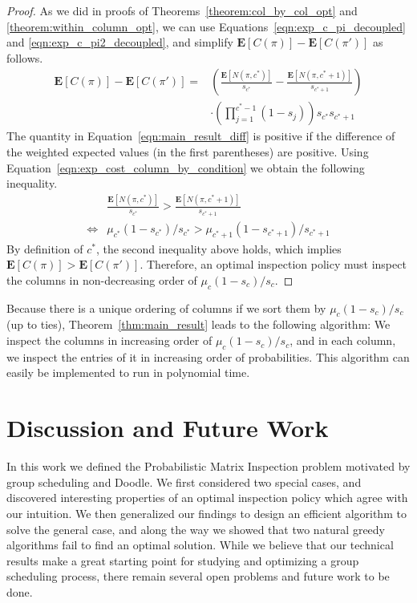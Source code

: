 \begin{proof}
 	As we did in proofs of Theorems~\ref{theorem:col_by_col_opt} and \ref{theorem:within_column_opt}, we can use Equations~\ref{eqn:exp_c_pi_decoupled} and \ref{eqn:exp_c_pi2_decoupled}, and simplify $\mathbf{E}[C(\pi)] - \mathbf{E}[C(\pi')]$ as follows.
	\small
 	\begin{equation} \label{eqn:main_result_diff}
 		\begin{aligned}
 		\mathbf{E}[C(\pi)] - \mathbf{E}[C(\pi')] ={} & \left(\frac{\mathbf{E}[N(\pi, c^*)]}{s_{c^*}}  - \frac{\mathbf{E}[N(\pi, c^*+1)]}{s_{c^*+1}} \right) \\
 		& \cdot \left( \prod_{j=1}^{c^*-1} (1 - s_j)\right) s_{c^*} s_{c^*+1}
 		 \end{aligned}
 	\end{equation}	
	\normalsize
 	The quantity in Equation~\ref{eqn:main_result_diff} is positive if the difference of the weighted expected values (in the first parentheses) are positive. Using Equation~\ref{eqn:exp_cost_column_by_condition} we obtain the following inequality.
 	\begin{equation*}
 		\begin{aligned}
 			{} &
 		\frac{\mathbf{E}[N(\pi, c^*)]}{s_{c^*}}  > \frac{\mathbf{E}[N(\pi, c^*+1)]}{s_{c^*+1}} \\
 		\Leftrightarrow &
 		\mu_{c^*} (1 - s_{c^*}) / s_{c^*} > \mu_{c^*+1}(1 - s_{c^*+1}) / s_{c^*+1} 
 		\end{aligned}
 	\end{equation*}
 	By definition of $c^*$, the second inequality above holds, which implies $\mathbf{E}[C(\pi)] > \mathbf{E}[C(\pi')]$.
 	Therefore, an optimal inspection policy must inspect the columns in non-decreasing order of $\mu_c(1 - s_c)/s_c$. 
 \end{proof}
 Because there is a unique ordering of columns if we sort them by $\mu_c(1-s_c)/s_c$ (up to ties), Theorem~\ref{thm:main_result} leads to the following algorithm: We inspect the columns in increasing order of $\mu_c(1-s_c)/s_c$, and in each column, we inspect the entries of it in increasing order of probabilities. 
 This algorithm can easily be implemented to run in polynomial time. 


\section{Discussion and Future Work} \label{matrix:sec:discussion}
In this work we defined the Probabilistic Matrix Inspection problem motivated by group scheduling and Doodle. 
We first considered two special cases, and discovered interesting properties of an optimal inspection policy which agree with our intuition. We then generalized our findings to design an efficient algorithm to solve the general case, and along the way we showed that two natural greedy algorithms fail to find an optimal solution. While we believe that our technical results make a great starting point for studying and optimizing a group scheduling process, there remain several open problems and future work to be done.

